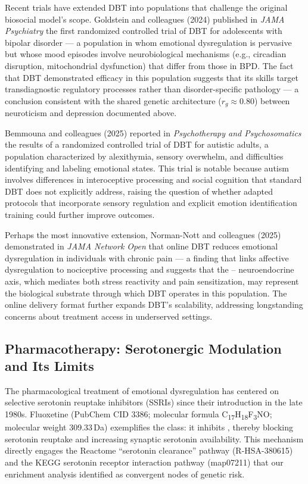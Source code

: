 Recent trials have extended DBT into populations that challenge the original
biosocial model's scope.
Goldstein and colleagues (2024) published in \emph{JAMA Psychiatry} the first
randomized controlled trial of DBT for adolescents with bipolar disorder —
a population in whom emotional dysregulation is pervasive but whose mood
episodes involve neurobiological mechanisms (e.g., circadian disruption,
mitochondrial dysfunction) that differ from those in BPD.
The fact that DBT demonstrated efficacy in this population suggests that its
skills target transdiagnostic regulatory processes rather than
disorder-specific pathology — a conclusion consistent with the shared genetic
architecture ($r_g \approx 0.80$) between neuroticism and depression documented
above.

Bemmouna and colleagues (2025) reported in \emph{Psychotherapy and
Psychosomatics} the results of a randomized controlled trial of DBT for
autistic adults, a population characterized by alexithymia, sensory
overwhelm, and difficulties identifying and labeling emotional
states.
This trial is notable because autism involves differences in interoceptive
processing and social cognition that standard DBT does not explicitly address,
raising the question of whether adapted protocols that incorporate sensory
regulation and explicit emotion identification training could further improve
outcomes.

Perhaps the most innovative extension, Norman-Nott and colleagues (2025)
demonstrated in \emph{JAMA Network Open} that online DBT reduces emotional
dysregulation in individuals with chronic pain — a finding that links affective
dysregulation to nociceptive processing and suggests that the
-- neuroendocrine axis, which mediates both stress
reactivity and pain sensitization, may represent the biological substrate
through which DBT operates in this population.
The online delivery format further expands DBT's scalability, addressing
longstanding concerns about treatment access in underserved settings.

\subsection*{Pharmacotherapy: Serotonergic Modulation and Its Limits}

The pharmacological treatment of emotional dysregulation has centered on
selective serotonin reuptake inhibitors (SSRIs) since their introduction in
the late 1980s.
Fluoxetine (PubChem CID 3386; molecular formula C\textsubscript{17}H\textsubscript{18}F\textsubscript{3}NO;
molecular weight 309.33\,Da) exemplifies the class: it inhibits ,
thereby blocking serotonin reuptake and increasing synaptic serotonin
availability.
This mechanism directly engages the Reactome ``serotonin clearance'' pathway
(R-HSA-380615) and the KEGG serotonin receptor interaction pathway (map07211)
that our enrichment analysis identified as convergent nodes of genetic risk.

